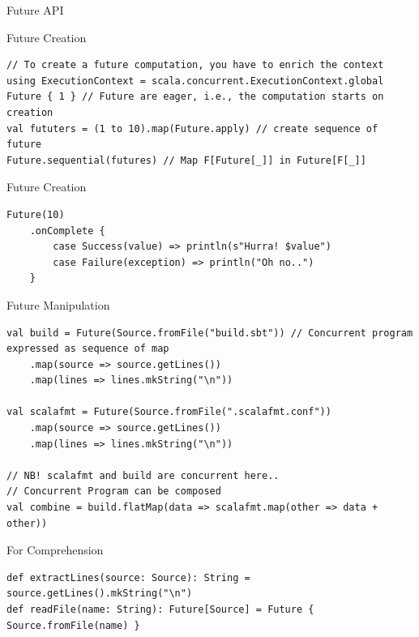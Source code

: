 \documentclass[presentation, 9pt]{beamer}\mode<presentation>{\usetheme{AMSBolognaFC}}
\begin{document}
\begin{frame}{Future API}
	\begin{alertblock}{Future Creation}
 \begin{tcolorbox}[left=0pt, top=0pt, bottom=0pt]
				\begin{verbatim}
// To create a future computation, you have to enrich the context
using ExecutionContext = scala.concurrent.ExecutionContext.global
Future { 1 } // Future are eager, i.e., the computation starts on creation
val fututers = (1 to 10).map(Future.apply) // create sequence of future
Future.sequential(futures) // Map F[Future[_]] in Future[F[_]]
				\end{verbatim}
			\end{tcolorbox}
	\end{alertblock}
	\begin{alertblock}{Future Creation}
		\begin{tcolorbox}[left=0pt, top=0pt, bottom=0pt]
					 \begin{verbatim}
Future(10)
	.onComplete {
		case Success(value) => println(s"Hurra! $value")
		case Failure(exception) => println("Oh no..")
	}
					 \end{verbatim}
				 \end{tcolorbox}
		 \end{alertblock}
		 
\begin{alertblock}{Future Manipulation}
	\begin{tcolorbox}[left=0pt, top=0pt, bottom=0pt]
					\begin{verbatim}
val build = Future(Source.fromFile("build.sbt")) // Concurrent program expressed as sequence of map
	.map(source => source.getLines())
	.map(lines => lines.mkString("\n"))

val scalafmt = Future(Source.fromFile(".scalafmt.conf"))
	.map(source => source.getLines())
	.map(lines => lines.mkString("\n"))

// NB! scalafmt and build are concurrent here..
// Concurrent Program can be composed
val combine = build.flatMap(data => scalafmt.map(other => data + other)) 
					\end{verbatim}
				\end{tcolorbox}
\end{alertblock}
\begin{alertblock}{For Comprehension }
	\begin{tcolorbox}[left=0pt, top=0pt, bottom=0pt]
					\begin{verbatim}
def extractLines(source: Source): String = source.getLines().mkString("\n")
def readFile(name: String): Future[Source] = Future { Source.fromFile(name) }


\end{verbatim}
\end{tcolorbox}
\end{alertblock}
\end{frame}
\end{document}
